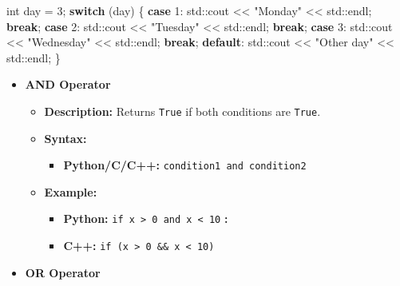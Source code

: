 \documentclass[
  letterpaper,
  DIV=11,
  numbers=noendperiod]{scrreprt}
\newenvironment{Shaded}{\begin{snugshade}}{\end{snugshade}}
\newcommand{\ControlFlowTok}[1]{\textcolor[rgb]{0.00,0.23,0.31}{\textbf{#1}}}
\newcommand{\DataTypeTok}[1]{\textcolor[rgb]{0.68,0.00,0.00}{#1}}
\newcommand{\DecValTok}[1]{\textcolor[rgb]{0.68,0.00,0.00}{#1}}
\newcommand{\NormalTok}[1]{\textcolor[rgb]{0.00,0.23,0.31}{#1}}
\newcommand{\OperatorTok}[1]{\textcolor[rgb]{0.37,0.37,0.37}{#1}}
\newcommand{\StringTok}[1]{\textcolor[rgb]{0.13,0.47,0.30}{#1}}
\providecommand{\tightlist}{%
  \setlength{\itemsep}{0pt}\setlength{\parskip}{0pt}}
\begin{document}
\begin{tcolorbox}[enhanced jigsaw, colframe=quarto-callout-note-color-frame, toprule=.15mm, bottomrule=.15mm, rightrule=.15mm, colback=white, breakable, arc=.35mm, opacityback=0, left=2mm, leftrule=.75mm]
\begin{Shaded}
\begin{Highlighting}[]
\DataTypeTok{int}\NormalTok{ day }\OperatorTok{=} \DecValTok{3}\OperatorTok{;}
\ControlFlowTok{switch} \OperatorTok{(}\NormalTok{day}\OperatorTok{)} \OperatorTok{\{}
    \ControlFlowTok{case} \DecValTok{1}\OperatorTok{:}
\NormalTok{        std}\OperatorTok{::}\NormalTok{cout }\OperatorTok{\textless{}\textless{}} \StringTok{"Monday"} \OperatorTok{\textless{}\textless{}}\NormalTok{ std}\OperatorTok{::}\NormalTok{endl}\OperatorTok{;}
        \ControlFlowTok{break}\OperatorTok{;}
    \ControlFlowTok{case} \DecValTok{2}\OperatorTok{:}
\NormalTok{        std}\OperatorTok{::}\NormalTok{cout }\OperatorTok{\textless{}\textless{}} \StringTok{"Tuesday"} \OperatorTok{\textless{}\textless{}}\NormalTok{ std}\OperatorTok{::}\NormalTok{endl}\OperatorTok{;}
        \ControlFlowTok{break}\OperatorTok{;}
    \ControlFlowTok{case} \DecValTok{3}\OperatorTok{:}
\NormalTok{        std}\OperatorTok{::}\NormalTok{cout }\OperatorTok{\textless{}\textless{}} \StringTok{"Wednesday"} \OperatorTok{\textless{}\textless{}}\NormalTok{ std}\OperatorTok{::}\NormalTok{endl}\OperatorTok{;}
        \ControlFlowTok{break}\OperatorTok{;}
    \ControlFlowTok{default}\OperatorTok{:}
\NormalTok{        std}\OperatorTok{::}\NormalTok{cout }\OperatorTok{\textless{}\textless{}} \StringTok{"Other day"} \OperatorTok{\textless{}\textless{}}\NormalTok{ std}\OperatorTok{::}\NormalTok{endl}\OperatorTok{;}
\OperatorTok{\}}
\end{Highlighting}
\end{Shaded}

\begin{itemize}
\item
  \textbf{AND Operator}

  \begin{itemize}
  \item
    \textbf{Description:} Returns \texttt{True} if both conditions are
    \texttt{True}.
  \item
    \textbf{Syntax:}

    \begin{itemize}
    \tightlist
    \item
      \textbf{Python/C/C++:} \texttt{condition1\ and\ condition2}
    \end{itemize}
  \item
    \textbf{Example:}

    \begin{itemize}
    \tightlist
    \item
      \textbf{Python:}
      \texttt{if\ x\ \textgreater{}\ 0\ and\ x\ \textless{}\ 10}
      \textbf{:}
    \item
      \textbf{C++:}
      \texttt{if\ (x\ \textgreater{}\ 0\ \&\&\ x\ \textless{}\ 10)}
    \end{itemize}
  \end{itemize}
\item
  \textbf{OR Operator}


\end{itemize}
\end{tcolorbox}
\end{document}

